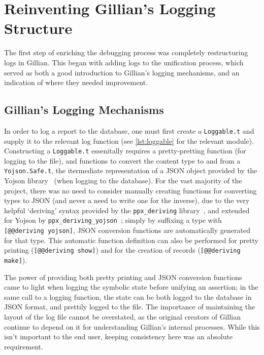 
\section{Reinventing Gillian's Logging Structure}\label{sec:log-structure}

The first step of enriching the debugging process was completely restructuring
logs in Gillian. This began with adding logs to the unification process,
which served as both a good introduction to Gillian's logging mechanisms,
and an indication of where they needed improvement.


\subsection{Gillian's Logging Mechanisms}

In order to log a report to the database, one must first create a
\texttt{Loggable.t} and supply it to the relevant log function (see
\autoref{lst:loggable} for the relevant module). Constructing a
\texttt{Loggable.t} essenitally requires a pretty-pretting function (for logging
to the file), and functions to convert the content type to and from a
\texttt{Yojson.Safe.t}, the itermediate representation of a JSON object provided
by the Yojson library~\cite{yojson} (when logging to the database). For the vast
majority of the project, there was no need to consider manually creating
functions for converting types to JSON (and never a need to write one for the
inverse), due to the very helpful `deriving' syntax provided by the
\texttt{ppx\_deriving} library~\cite{ppx-deriving}, and extended for Yojson by
\texttt{ppx\_deriving\_yojson}~\cite{ppx-deriving-yojson}; simply by suffixing a
type with \texttt{[@@deriving yojson]}, JSON conversion functions are
automatically generated for that type. This automatic function definition can
also be performed for pretty printing (\texttt{[@@deriving show]}) and for
the creation of records (\texttt{[@@deriving make]}).

The power of providing both pretty printing and JSON conversion functions came
to light when logging the symbolic state before unifying an assertion; in the
same call to a logging function, the state can be both logged to the database
in JSON format, and prettily logged to the file. The importance of maintaining
the layout of the log file cannot be overstated, as the original creators of
Gillian continue to depend on it for understanding Gillian's internal processes.
While this isn't important to the end user, keeping consistency here was an
absolute requirement.

